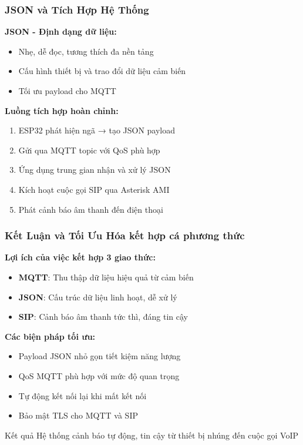 \begin{frame}
\frametitle{JSON và Tích Hợp Hệ Thống}

\textbf{JSON - Định dạng dữ liệu:}
\begin{itemize}
\item Nhẹ, dễ đọc, tương thích đa nền tảng
\item Cấu hình thiết bị và trao đổi dữ liệu cảm biến
\item Tối ưu payload cho MQTT
\end{itemize}

\textbf{Luồng tích hợp hoàn chỉnh:}
\begin{enumerate}
\item ESP32 phát hiện ngã → tạo JSON payload
\item Gửi qua MQTT topic với QoS phù hợp  
\item Ứng dụng trung gian nhận và xử lý JSON
\item Kích hoạt cuộc gọi SIP qua Asterisk AMI
\item Phát cảnh báo âm thanh đến điện thoại
\end{enumerate}
\end{frame}

\begin{frame}
\frametitle{Kết Luận và Tối Ưu Hóa kết hợp cá phương thức}

\textbf{Lợi ích của việc kết hợp 3 giao thức:}
\begin{itemize}
\item \textbf{MQTT}: Thu thập dữ liệu hiệu quả từ cảm biến
\item \textbf{JSON}: Cấu trúc dữ liệu linh hoạt, dễ xử lý
\item \textbf{SIP}: Cảnh báo âm thanh tức thì, đáng tin cậy
\end{itemize}

\textbf{Các biện pháp tối ưu:}
\begin{itemize}
\item Payload JSON nhỏ gọn tiết kiệm năng lượng
\item QoS MQTT phù hợp với mức độ quan trọng
\item Tự động kết nối lại khi mất kết nối
\item Bảo mật TLS cho MQTT và SIP
\end{itemize}

\begin{block}{Kết quả}
Hệ thống cảnh báo tự động, tin cậy từ thiết bị nhúng đến cuộc gọi VoIP
\end{block}
\end{frame}
